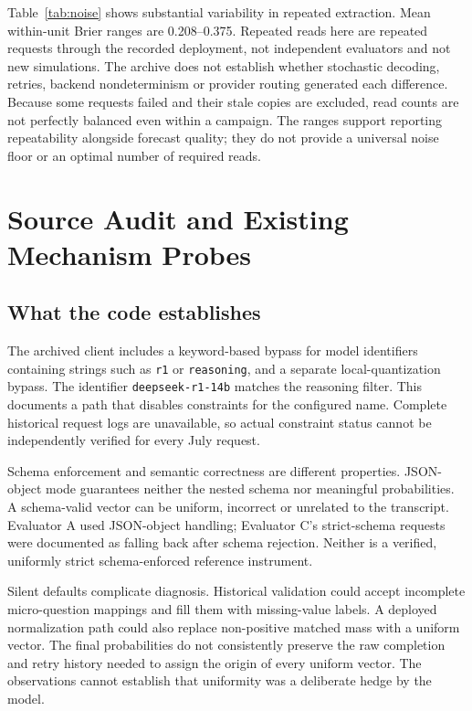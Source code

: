 \documentclass[10pt,conference]{IEEEtran}
\begin{document}
Table~\ref{tab:noise} shows substantial variability in repeated extraction.
Mean within-unit Brier ranges are 0.208--0.375. Repeated reads here are repeated
requests through the recorded deployment, not independent evaluators and not
new simulations. The archive does not establish whether stochastic decoding,
retries, backend nondeterminism or provider routing generated each difference.
Because some requests failed and their stale copies are excluded, read counts
are not perfectly balanced even within a campaign. The ranges support reporting
repeatability alongside forecast quality; they do not provide a universal
noise floor or an optimal number of required reads.

\section{Source Audit and Existing Mechanism Probes}
\label{sec:mechanism}
\subsection{What the code establishes}
The archived client includes a keyword-based bypass for model identifiers
containing strings such as \texttt{r1} or \texttt{reasoning}, and a separate
local-quantization bypass. The identifier \texttt{deepseek-r1-14b} matches
the reasoning filter. This documents a path that disables constraints for the
configured name. Complete historical request logs are unavailable, so actual
constraint status cannot be independently verified for every July request.

Schema enforcement and semantic correctness are different properties.
JSON-object mode guarantees neither the nested schema nor meaningful probabilities.
A schema-valid vector can be uniform, incorrect or unrelated to the transcript.
Evaluator A used JSON-object handling; Evaluator C's strict-schema requests were
documented as falling back after schema rejection. Neither is a verified,
uniformly strict schema-enforced reference instrument.

Silent defaults complicate diagnosis. Historical validation could accept
incomplete micro-question mappings and fill them with missing-value labels.
A deployed normalization path could also replace non-positive matched mass
with a uniform vector. The final probabilities do not consistently preserve
the raw completion and retry history needed to assign the origin of every
uniform vector. The observations cannot establish that uniformity was a
deliberate hedge by the model.
\end{document}
